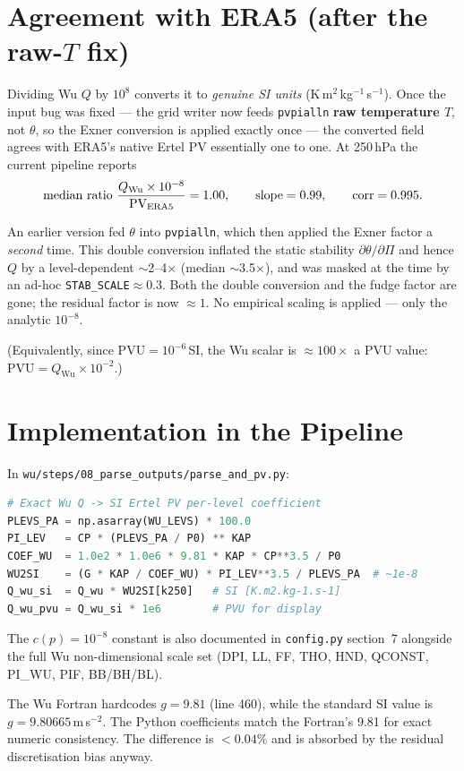 \section{Agreement with ERA5 (after the raw-$T$ fix)}

Dividing Wu $Q$ by $10^{8}$ converts it to \emph{genuine SI units}
(K\,m$^{2}$\,kg$^{-1}$\,s$^{-1}$).  Once the input bug was fixed --- the
grid writer now feeds \texttt{pvpialln} \textbf{raw temperature $T$}, not
$\theta$, so the Exner conversion is applied exactly once --- the
converted field agrees with ERA5's native Ertel PV essentially one to
one.  At 250\,hPa the current pipeline reports
\begin{equation}
\text{median ratio } \frac{Q_{\text{Wu}}\times10^{-8}}{\text{PV}_{\text{ERA5}}} = 1.00,
\qquad \text{slope} = 0.99,\qquad \operatorname{corr} = 0.995 .
\end{equation}

\begin{warnbox}
An earlier version fed \emph{$\theta$} into \texttt{pvpialln}, which then
applied the Exner factor a \emph{second} time.  This double conversion
inflated the static stability $\partial\theta/\partial\Pi$ and hence $Q$
by a level-dependent $\sim$2--4$\times$ (median $\sim$3.5$\times$), and
was masked at the time by an ad-hoc \texttt{STAB\_SCALE}$\approx$0.3.
Both the double conversion and the fudge factor are gone; the residual
factor is now $\approx 1$.  No empirical scaling is applied --- only the
analytic $10^{-8}$.
\end{warnbox}

\noindent (Equivalently, since $\mathrm{PVU}=10^{-6}$\,SI, the Wu scalar
is $\approx 100\times$ a PVU value: $\mathrm{PVU}=Q_{\text{Wu}}\times10^{-2}$.)

\section{Implementation in the Pipeline}

In \texttt{wu/steps/08\_parse\_outputs/parse\_and\_pv.py}:
\begin{lstlisting}[language=Python]
# Exact Wu Q -> SI Ertel PV per-level coefficient
PLEVS_PA = np.asarray(WU_LEVS) * 100.0
PI_LEV   = CP * (PLEVS_PA / P0) ** KAP
COEF_WU  = 1.0e2 * 1.0e6 * 9.81 * KAP * CP**3.5 / P0
WU2SI    = (G * KAP / COEF_WU) * PI_LEV**3.5 / PLEVS_PA  # ~1e-8
Q_wu_si  = Q_wu * WU2SI[k250]   # SI [K.m2.kg-1.s-1]
Q_wu_pvu = Q_wu_si * 1e6        # PVU for display
\end{lstlisting}

The $c(p) = 10^{-8}$ constant is also documented in
\texttt{config.py} section~7 alongside the full Wu non-dimensional
scale set (DPI, LL, FF, THO, HND, QCONST, PI\_WU, PIF, BB/BH/BL).

\begin{warnbox}[COEF uses Fortran g=9.81]
The Wu Fortran hardcodes $g=9.81$ (line 460), while the standard
SI value is $g=9.80665$\,m\,s$^{-2}$.  The Python coefficients
match the Fortran's 9.81 for exact numeric consistency.  The
difference is $<0.04\%$ and is absorbed by the residual
discretisation bias anyway.
\end{warnbox}
